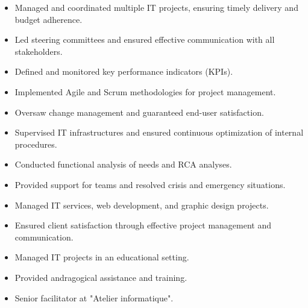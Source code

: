 \documentclass[10pt,a4paper,ragged2e,withhyper,normalphoto]{altacv}
\begin{document}
\begin{paracol}{2}

\begin{itemize}
\item Managed and coordinated multiple IT projects, ensuring timely delivery and budget adherence.
\item Led steering committees and ensured effective communication with all stakeholders.
\item Defined and monitored key performance indicators (KPIs).
\item Implemented Agile and Scrum methodologies for project management.
\item Oversaw change management and guaranteed end-user satisfaction.
\item Supervised IT infrastructures and ensured continuous optimization of internal procedures.
\item Conducted functional analysis of needs and RCA analyses.
\item Provided support for teams and resolved crisis and emergency situations.
\end{itemize}

\divider

\begin{itemize}
\item Managed IT services, web development, and graphic design projects.
\item Ensured client satisfaction through effective project management and communication.
\end{itemize}

\divider

\begin{itemize}
\item Managed IT projects in an educational setting.
\item Provided andragogical assistance and training.
\end{itemize}

\switchcolumn

\begin{itemize}
\item Senior facilitator at "Atelier informatique".
\end{itemize}


\end{paracol}
\end{document}
